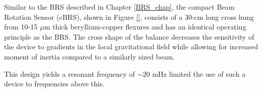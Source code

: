 \documentclass [12pt, proquest]{uwthesis}[2019]
\begin{document}
Similar to the BRS described in Chapter \ref{BRS_chap}, the compact Beam Rotation Sensor (cBRS), shown in Figure \ref{}, consists of a 30-cm long cross hung from 10-15 $\mu$m thick beryllium-copper flexures and has an identical operating principle as the BRS. The cross shape of the balance decreases the sensitivity of the device to gradients in the local gravitational field while allowing for increased moment of inertia compared to a similarly sized beam. 

This design yields a resonant frequency of $\sim$20 mHz limited the use of such a device to frequencies above this. 

\begin{figure}%
\begin{center}
\\
\caption{}
\label{BRS}
\end{center}
\end{figure}
\end{document}

